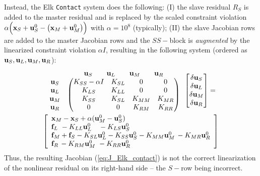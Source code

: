 \documentclass[11pt]{article}
\newcommand{\vecx}{{\bf x}}
\newcommand{\vecu}{{\bf u}}
\newcommand{\vecf}{{\bf f}}
\begin{document}
Instead, the Elk \texttt{Contact} system does the following:
(I) the slave residual $R_S$ is added to the master residual and is replaced by the scaled constraint violation $\alpha\Bigl(\vecx_S+\vecu_S^0-\left(\vecx_M+\vecu_M^0\right)\Bigr)$
with $\alpha = 10^8$ (typically); (II) the slave Jacobian rows are added to the master Jacobian rows and the $SS-$block is \emph{augmented} by the linearized constraint violation $\alpha I$,
resulting in the following system (ordered as $\vecu_S, \vecu_L, \vecu_M, \vecu_R$):
\begin{multline}
\label{eq:J_Elk_contact}
\begin{array}{lc}  &  \begin{array}{ccccc} \vecu_S \quad & \vecu_L \quad & \vecu_M \quad & \vecu_R\end{array}\\
\begin{matrix} \vecu_S\\ \vecu_L \\ \vecu_M \\ \vecu_R\end{matrix} &
\begin{pmatrix}
 K_{SS} - \alpha I& K_{SL} &  0   &  0\\
 K_{LS}     & K_{LL} &   0   &  0 \\
 K_{SS}     &   K_{SL}    & K_{MM}& K_{MR}\\
 0     &   0    & K_{RM}& K_{RR}\\
\end{pmatrix}
\end{array}
\begin{bmatrix}
\delta \vecu_S\\ \delta \vecu_L \\ \delta \vecu_M \\ \delta \vecu_R
\end{bmatrix}
=\\
\left[\begin{array}{l}
\vecx_M - \vecx_S + \alpha(\vecu_M^0 - \vecu_S^0)\\
\vecf_L \ - K_{LL} \vecu_L^0 \ \ \ - K_{LS} \vecu_S^0 \\
\vecf_M + \vecf_S - K_{SL} \vecu_L^0 - K_{SS} \vecu_S^0 - K_{MM} \vecu_M^0 \, - K_{MR} \vecu_R^0\\
\vecf_R \, - K_{RM} \vecu_M^0 \ - K_{RR} \vecu_R^0 \\
\end{array}\right]
\end{multline}
Thus, the resulting Jacobian (\ref{eq:J_Elk_contact}) is not the correct linearization of the nonlinear residual on its right-hand side -- the $S-$row being incorrect.
\end{document}
